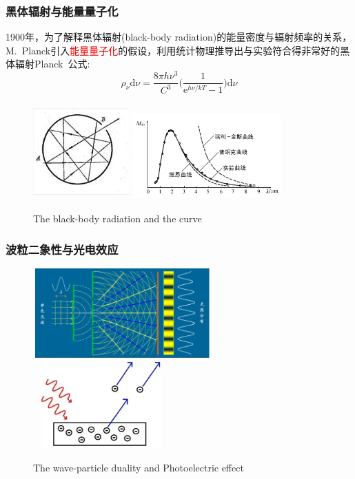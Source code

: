 \frame
{
	\frametitle{黑体辐射与能量量子化}
	\textrm{1900}年，为了解释黑体辐射\textrm{(black-body radiation)}的能量密度与辐射频率的关系，\textrm{M.~Planck}引入\textcolor{red}{能量量子化}的假设，利用统计物理推导出与实验符合得非常好的黑体辐射\textrm{Planck~}公式:~
	\begin{displaymath}
		\rho_{\nu}\mathrm{d}{\nu}=\dfrac{8{\pi}h{\nu}^3}{C^3}\bigg(\dfrac1{\mathrm{e}^{h\nu/kT}-1}\bigg)\mathrm{d}\nu
	\end{displaymath}
\begin{figure}[h!]
\centering
\vspace{-10.5pt}
\includegraphics[height=1.45in,width=1.45in,viewport=0 0 136 136,clip]{Figures/Black_box.jpg}
\hskip 1pt
\includegraphics[height=1.32in,width=2.25in,viewport=0 0 390 215,clip]{Figures/Black_box_curve.png}
\caption{\textrm{The black-body radiation and the curve}}
\label{Black_box}
\end{figure}
}

\frame
{
	\frametitle{波粒二象性与光电效应}
\begin{figure}[h!]
\centering
\vspace{-15.5pt}
\includegraphics[height=1.35in,width=2.70in,viewport=0 0 536 280,clip]{Figures/wave-particle_duality.png}
\vskip 1pt
\includegraphics[height=1.32in,width=2.05in,viewport=0 0 620 455,clip]{Figures/Photoelectic_effect.png}
\caption{\textrm{The wave-particle duality and Photoelectric effect}}
\label{photo:wave_and_particle}
\end{figure}
}

